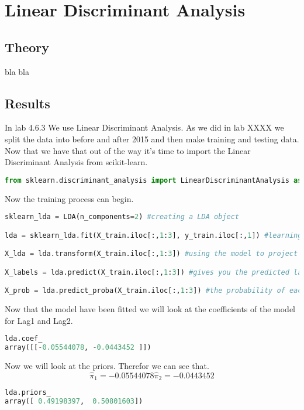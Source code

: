 \section{Linear Discriminant Analysis}

\subsection{Theory}
bla bla

\subsection{Results}
In lab 4.6.3 We use Linear Discriminant Analysis. As we did in lab XXXX we split the data into before and after 2015 and then make training and testing data. Now that we have that out of the way it's time to import the Linear Discriminant Analysis from scikit-learn.
\begin{lstlisting}[language=Python]
from sklearn.discriminant_analysis import LinearDiscriminantAnalysis as LDA
\end{lstlisting}

Now the training process can begin.

\begin{lstlisting}[language=Python]
sklearn_lda = LDA(n_components=2) #creating a LDA object

lda = sklearn_lda.fit(X_train.iloc[:,1:3], y_train.iloc[:,1]) #learning the projection matrix

X_lda = lda.transform(X_train.iloc[:,1:3]) #using the model to project X. Project data to maximize class separation.

X_labels = lda.predict(X_train.iloc[:,1:3]) #gives you the predicted label for each sample

X_prob = lda.predict_proba(X_train.iloc[:,1:3]) #the probability of each sample to belong to each class
\end{lstlisting}

Now that the model have been fitted we will look at the coefficients of the model for Lag1 and Lag2.

\begin{lstlisting}[language=Python]
lda.coef_
array([[-0.05544078, -0.0443452 ]])
\end{lstlisting}

Now we will look at the priors. Therefor we can see that. $$ \hat{ \pi }_1 = -0.05544078  \hat{ \pi }_2 = -0.0443452 $$ 
\begin{lstlisting}[language=Python]
lda.priors_
array([ 0.49198397,  0.50801603])
\end{lstlisting}


